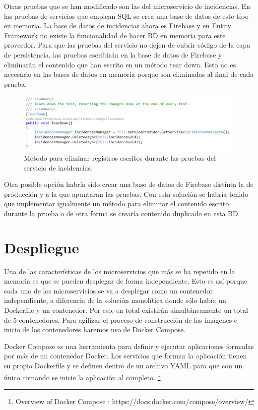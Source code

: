 \documentclass[11pt,spanish,listoffigures]{tfgetsinf}
\begin{document}
Otras pruebas que se han modificado son las del microservicio de incidencias. En las pruebas de servicios que emplean SQL se crea una base de datos de este tipo en memoria. La base de datos de incidencias ahora es Firebase y en Entity Framework no existe la funcionalidad de hacer BD en memoria para este proveedor. Para que las pruebas del servicio no dejen de cubrir código de la capa de persistencia, las pruebas escribirán en la base de datos de Firebase y eliminarán el contenido que han escrito en un método tear down. Esto no es necesario en las bases de datos en memoria porque son eliminadas al final de cada prueba.

\begin{figure}[h]
\centering
\includegraphics[scale=0.6]{TearDown}
\caption{Método para eliminar registros escritos durante las pruebas del servicio de incidencias.}
\end{figure}

Otra posible opción habría sido crear una base de datos de Firebase distinta la de producción y a la que apuntaran las pruebas. Con esta solución se habría tenido que implementar igualmente un método para eliminar el contenido escrito durante la prueba o de otra forma se crearía contenido duplicado en esta BD.

\section{Despliegue} \label{sect:DespliegueMicroservicios}

Una de las características de los microservicios que más se ha repetido en la memoria es que se pueden desplegar de forma independiente. Esto es así porque cada uno de los microservicios se va a desplegar como un contenedor independiente, a diferencia de la solución monolítica donde sólo había un Dockerfile y un contenedor. Por eso, en total existirán simultáneamente un total de 5 contenedores. Para agilizar el proceso de construcción de las imágenes e inicio de los contenedores haremos uso de Docker Compose. 

Docker Compose es una herramienta para definir y ejecutar aplicaciones formadas por más de un contenedor Docker. Los servicios que forman la aplicación tienen su propio Dockerfile y se definen dentro de un archivo YAML para que con un único comando se inicie la aplicación al completo. \footnote{ Overview of Docker Compose
: https://docs.docker.com/compose/overview/} 
\end{document}

